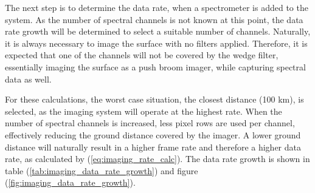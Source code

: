 The next step is to determine the data rate, when a spectrometer is added to the system. As the number of spectral channels is not known at this point, the data rate growth will be determined to select a suitable number of channels. Naturally, it is always necessary to image the surface with no filters applied. Therefore, it is expected that one of the channels will not be covered by the wedge filter, essentially imaging the surface as a push broom imager, while capturing spectral data as well.

For these calculations, the worst case situation, the closest distance (100 km), is selected, as the imaging system will operate at the highest rate. When the number of spectral channels is increased, less pixel rows are used per channel, effectively reducing the ground distance covered by the imager. A lower ground distance will naturally result in a higher frame rate and therefore a higher data rate, as calculated by (\ref{eq:imaging_rate_calc}). The data rate growth is shown in table (\ref{tab:imaging_data_rate_growth}) and figure (\ref{fig:imaging_data_rate_growth}).
